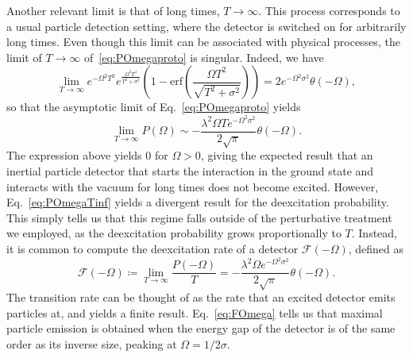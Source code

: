 \documentclass[letterpaper,12pt,titlepage,oneside,final]{book}
\begin{document}
Another relevant limit is that of long times, $T\to \infty$. This process corresponds to a usual particle detection setting, where the detector is switched on for arbitrarily long times. Even though this limit can be associated with physical processes, the limit of $T\to\infty$ of~\eqref{eq:POmegaproto} is singular. Indeed, we have
\begin{equation}
    \lim_{T\to \infty} e^{- \Omega^2 T^2}e^{\frac{\Omega^2T^4}{T^2 + \sigma^2}}\left(1-\text{erf}\left(\frac{\Omega T^2}{\sqrt{T^2 + \sigma^2}}\right)\right) = 2 e^{- \Omega^2 \sigma^2}\theta(-\Omega),
\end{equation}
so that the asymptotic limit of Eq.~\eqref{eq:POmegaproto} yields
\begin{equation}\label{eq:POmegaTinf}
    \lim_{T\to \infty} P(\Omega) \sim - \frac{\lambda^2 \Omega T e^{- \Omega^2 \sigma^2}}{2 \sqrt{\pi}}\theta(-\Omega).
\end{equation}
The expression above yields $0$ for $\Omega>0$, giving the expected result that an inertial particle detector that starts the interaction in the ground state and interacts with the vacuum for long times does not become excited. However, Eq.~\eqref{eq:POmegaTinf} yields a divergent result for the deexcitation probability. This simply tells us that this regime falls outside of the perturbative treatment we employed, as the deexcitation probability grows proportionally to $T$. Instead, it is common to compute the deexcitation rate of a detector $\mathcal{F}(-\Omega)$, defined as
\begin{equation}\label{eq:FOmega}
    \mathcal{F}(-\Omega) \coloneqq \lim_{T\to \infty} \frac{P(- \Omega)}{T} =  - \frac{\lambda^2 \Omega e^{- \Omega^2 \sigma^2}}{2 \sqrt{\pi}}\theta(-\Omega).
\end{equation}
The transition rate can be thought of as the rate that an excited detector emits particles at, and yields a finite result. Eq.~\eqref{eq:FOmega} tells us that maximal particle emission is obtained when the energy gap of the detector is of the same order as its inverse size, peaking at $\Omega = 1/2\sigma$. 

\end{document}
